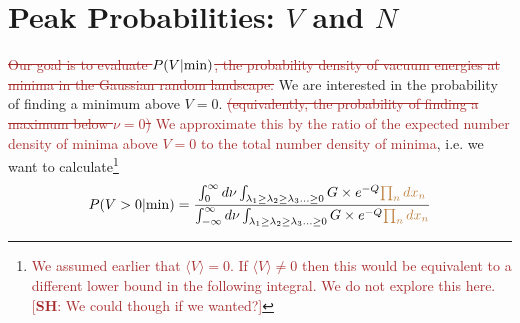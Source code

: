 \documentclass[12pt]{article}
\newcommand{\re}[1]{\textcolor{blue}{[{\bf RE}: #1]}}
\newcommand{\SH}[1]{\textcolor{brown}{[{\bf SH}: #1]}}
\newcommand{\sh}[1]{\textcolor{brown}{#1}}
\begin{document}



\section{Peak Probabilities: $V$ and $N$} \label{PeakNumbers}

\sh{\sout{Our goal is to evaluate $P(V|{\rm min})$, the probability density of vacuum energies at minima in the Gaussian random landscape.}} We are interested in the probability of finding a minimum above $V = 0$. \sh{\sout{(equivalently, the probability of finding a maximum below $\nu = 0$)} We approximate this by the ratio of the expected number density of minima above $V=0$ to the total number density of minima}, i.e. we want to calculate\footnote{\sh{We assumed earlier that $\langle V \rangle = 0$. If $\langle V \rangle \neq 0$ then this would be equivalent to a different lower bound in the following integral. We do not explore this here. \SH{We could though if we wanted?}}}
\begin{equation} \label{PminIntegral}
  P(V>0|{\rm min}) =  \frac{\int^\infty_0 d\nu \int_{\lambda_1 \geq \lambda_2 \geq \lambda_3 \ldots \geq 0} G \times e^{-Q} \sh{\prod_n dx_n}}{\int^\infty_{-\infty} d\nu \int_{\lambda_1 \geq \lambda_2 \geq \lambda_3 \ldots \geq 0} G \times e^{-Q} \sh{\prod_n dx_n}}
  \end{equation}
\end{document}
